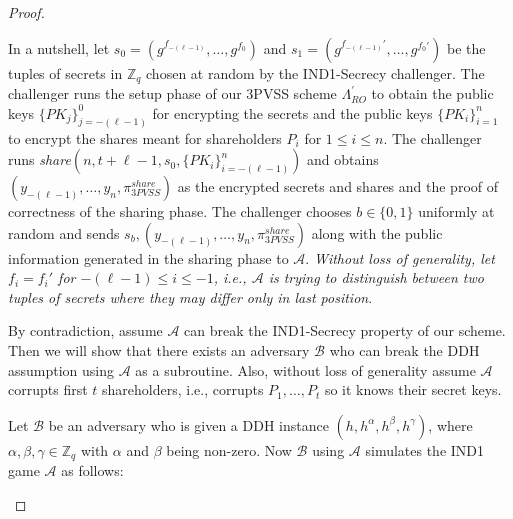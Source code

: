 \begin{proof}
\begin{itemize}
      In a nutshell, let $s_0=(g^{f_{-(\ell-1)}},\dots,g^{f_0})$ and $s_1=(g^{f_{-(\ell-1)}'},\dots,g^{f_0'})$ 
      be the tuples of secrets in $\mathbb{Z}_q$ chosen at random by the IND1-Secrecy challenger. The 
      challenger runs the setup phase of our 3PVSS scheme $\Lambda_{RO}^{'}$ to obtain the 
      public keys $\{PK_j\}_{j=-(\ell-1)}^0$ for encrypting the secrets and the public keys 
      $\{PK_i\}_{i=1}^n$ to encrypt the shares meant for shareholders $P_i$ for 
      $1\leq i\leq n$. The challenger runs \textit{share}$(n,t+\ell-1,s_0,\{PK_i\}_{i=-(\ell-1)}^n)$ 
      and obtains $(y_{-(\ell-1)},\dots,y_n,\pi_{3PVSS}^{share})$ as the encrypted secrets and shares and 
      the proof of correctness of the sharing phase. The challenger chooses $b\in\{0,1\}$ uniformly at 
      random and sends $s_b,(y_{-(\ell-1)},\dots,y_n,\pi_{3PVSS}^{share})$ along with the public information generated in 
      the sharing phase to $\mathcal{A}$. \textit{Without loss of generality, let $f_i=f_i'$ for 
      $-(\ell-1)\leq i\leq -1$, i.e., $\mathcal{A}$ is trying to distinguish between two tuples of 
      secrets where they may differ only in last position}.\par

      By contradiction, assume $\mathcal{A}$ can break the IND1-Secrecy property 
      of our scheme. Then we will show that there exists an adversary $\mathcal{B}$ who can 
      break the DDH assumption using $\mathcal{A}$ as a subroutine. Also, without loss of 
      generality assume $\mathcal{A}$ corrupts first $t$ shareholders, i.e., corrupts 
      $P_1,\dots,P_t$ so it knows their secret keys.\par

      Let $\mathcal{B}$ be an adversary who is given a DDH instance $(h,h^\alpha,h^\beta,h^\gamma)$, 
      where $\alpha,\beta,\gamma\in\mathbb{Z}_q$ with $\alpha$ and $\beta$ being non-zero. 
      Now $\mathcal{B}$ using $\mathcal{A}$ simulates the IND1 game $\mathcal{A}$ as follows:
      

\end{itemize}
\end{proof}
